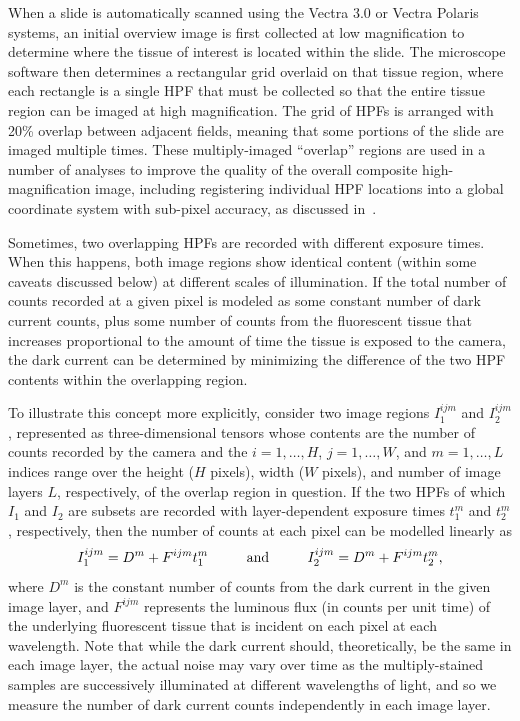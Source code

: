 \documentclass[letterpaper,11pt]{article}
\begin{document}
When a slide is automatically scanned using the Vectra 3.0 or Vectra Polaris systems, an initial overview image is first collected at low magnification to determine where the tissue of interest is located within the slide. The microscope software then determines a rectangular grid overlaid on that tissue region, where each rectangle is a single HPF that must be collected so that the entire tissue region can be imaged at high magnification. The grid of HPFs is arranged with 20\% overlap between adjacent fields, meaning that some portions of the slide are imaged multiple times. These multiply-imaged ``overlap'' regions are used in a number of analyses to improve the quality of the overall composite high-magnification image, including registering individual HPF locations into a global coordinate system with sub-pixel accuracy, as discussed in~\cite{Heshy}.

Sometimes, two overlapping HPFs are recorded with different exposure times. When this happens, both image regions show identical content (within some caveats discussed below) at different scales of illumination. If the total number of counts recorded at a given pixel is modeled as some constant number of dark current counts, plus some number of counts from the fluorescent tissue that increases proportional to the amount of time the tissue is exposed to the camera, the dark current can be determined by minimizing the difference of the two HPF contents within the overlapping region.


To illustrate this concept more explicitly, consider two image regions $I^{ijm}_{1}$ and $I^{ijm}_{2}$, represented as three-dimensional tensors whose contents are the number of counts recorded by the camera and the $i=1, \ldots, H$, $j = 1, \ldots, W$, and $m = 1, \ldots, L$ indices range over the height ($H$ pixels), width ($W$ pixels), and number of image layers $L$, respectively, of the overlap region in question. If the two HPFs of which $I_{1}$ and $I_{2}$ are subsets are recorded with layer-dependent exposure times $t^{m}_{1}$ and $t^{m}_{2}$, respectively, then the number of counts at each pixel can be modelled linearly as
\begin{equation}
I^{ijm}_{1} = D^{m} + F^{ijm} t^{m}_{1} \hspace{0.08\textwidth} \mathrm{and} \hspace{0.08\textwidth} I^{ijm}_{2} = D^{m} + F^{ijm} t^{m}_{2},
\end{equation}
where $D^{m}$ is the constant number of counts from the dark current in the given image layer, and $F^{ijm}$ represents the luminous flux (in counts per unit time) of the underlying fluorescent tissue that is incident on each pixel at each wavelength. Note that while the dark current should, theoretically, be the same in each image layer, the actual noise may vary over time as the multiply-stained samples are successively illuminated at different wavelengths of light, and so we measure the number of dark current counts independently in each image layer.
\end{document}
